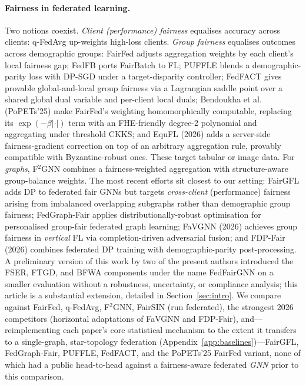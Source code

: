 \documentclass[pdflatex,sn-mathphys-num]{sn-jnl}
\theoremstyle{thmstyleone}%
\theoremstyle{thmstyletwo}%
\theoremstyle{thmstylethree}%
\begin{document}
\paragraph{Fairness in federated learning.}
Two notions coexist. \emph{Client (performance) fairness} equalises accuracy
across clients: q-FedAvg \cite{li2020fair} up-weights high-loss clients.
\emph{Group fairness} equalises outcomes across demographic groups: FairFed
\cite{ezzeldin2023fairfed} adjusts aggregation weights by each client's local
fairness gap; FedFB ports FairBatch to FL; PUFFLE \cite{corbucci2024puffle}
blends a demographic-parity loss with DP-SGD under a target-disparity
controller; FedFACT \cite{fedfact2025} gives provable global-and-local group
fairness via a Lagrangian saddle point over a shared global dual variable and
per-client local duals; Bendoukha et al.\ \cite{bendoukha2025popets}
(PoPETs'25) make FairFed's weighting homomorphically computable, replacing its
$\exp(-\beta|\cdot|)$ term with an FHE-friendly degree-2 polynomial and
aggregating under threshold CKKS; and EquFL \cite{yu2026equfl} (2026) adds a
server-side fairness-gradient correction on top of an arbitrary aggregation
rule, provably compatible with Byzantine-robust ones. These target tabular or
image data. For
\emph{graphs}, F$^2$GNN \cite{f2gnn2023} combines a fairness-weighted
aggregation with structure-aware group-balance weights. The most recent
efforts sit closest to our setting: FairGFL \cite{fairgfl2026} adds DP to
federated fair GNNs but targets \emph{cross-client} (performance) fairness
arising from imbalanced overlapping subgraphs rather than demographic group
fairness; FedGraph-Fair \cite{fedgraphfair2026} applies distributionally-robust
optimisation for personalised group-fair federated graph learning; FaVGNN
\cite{wang2026favgnn} (2026) achieves group fairness in \emph{vertical} FL via
completion-driven adversarial fusion; and FDP-Fair \cite{xue2026fdpfair} (2026)
combines federated DP training with demographic-parity post-processing. A
preliminary version of this work by two of the present authors
\cite{dang2026fedfairgnn} introduced the FSER, FTGD, and BFWA components under
the name FedFairGNN on a smaller evaluation without a robustness, uncertainty,
or compliance analysis; this article is a
substantial
extension, detailed in Section~\ref{sec:intro}. We
compare against FairFed, q-FedAvg, F$^2$GNN, FairSIN (run federated),
the strongest 2026 competitors (horizontal adaptations of FaVGNN and FDP-Fair),
and---reimplementing each paper's core statistical mechanism to the extent it
transfers to a single-graph, star-topology federation
(Appendix~\ref{app:baselines})---FairGFL, FedGraph-Fair, PUFFLE, FedFACT, and
the PoPETs'25 FairFed variant, none of which had a public head-to-head against
a fairness-aware federated \emph{GNN} prior to this comparison.
\end{document}
